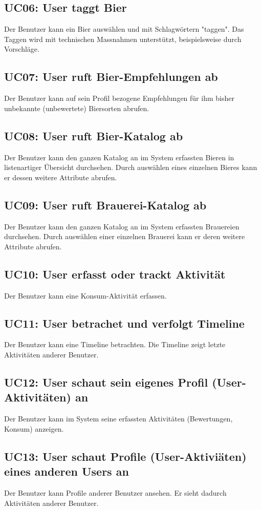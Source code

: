 \documentclass[10pt,a4paper]{scrartcl}
\begin{document}
\subsection*{UC06: User taggt Bier}
Der Benutzer kann ein Bier auswählen und mit Schlagwörtern "taggen". Das Taggen wird mit technischen Massnahmen unterstützt, beispielsweise durch Vorschläge.
\subsection*{UC07: User ruft Bier-Empfehlungen ab}
Der Benutzer kann auf sein Profil bezogene Empfehlungen für ihm bisher unbekannte (unbewertete) Biersorten abrufen.
\subsection*{UC08: User ruft Bier-Katalog ab}
Der Benutzer kann den ganzen Katalog an im System erfassten Bieren in listenartiger Übersicht durchsehen. Durch auswählen eines einzelnen Bieres kann er dessen weitere Attribute abrufen.
\subsection*{UC09: User ruft Brauerei-Katalog ab}
Der Benutzer kann den ganzen Katalog an im System erfassten Brauereien durchsehen. Durch auswählen einer einzelnen Brauerei kann er deren weitere Attribute abrufen.
\subsection*{UC10: User erfasst oder trackt Aktivität}
Der Benutzer kann eine Konsum-Aktivität erfassen.
\subsection*{UC11: User betrachet und verfolgt Timeline}
Der Benutzer kann eine Timeline betrachten. Die Timeline zeigt letzte Aktivitäten anderer Benutzer.
\subsection*{UC12: User schaut sein eigenes Profil (User-Aktivitäten) an}
Der Benutzer kann im System seine erfassten Aktivitäten (Bewertungen, Konsum) anzeigen.
\subsection*{UC13: User schaut Profile (User-Aktiviäten) eines anderen Users an}
Der Benutzer kann Profile anderer Benutzer ansehen. Er sieht dadurch Aktivitäten anderer Benutzer.
\end{document}
